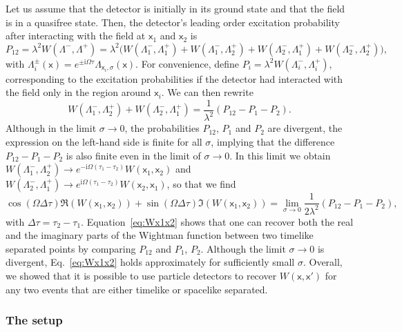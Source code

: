\documentclass[letterpaper,12pt,titlepage,oneside,final]{book}
\newcommand{\mf}{\mathsf}%
\newcommand{\ii}{\mathrm{i}}
\begin{document}
    Let us assume that the detector is initially in its ground state and that the field is in a quasifree state. Then, the detector's leading order excitation probability after interacting with the field at $\mf x_1$ and $\mf x_2$ is
    \begin{equation}
        P_{12} = \lambda^2 W(\Lambda^-,\Lambda^+) = \lambda^2 \big(W(\Lambda_1^-,\Lambda_1^+)+W(\Lambda_1^-,\Lambda_2^+)+W(\Lambda_2^-,\Lambda_1^+)+W(\Lambda_2^-,\Lambda_2^+)\big),
    \end{equation}
    with $\Lambda_i^\pm(\mf x) = e^{\pm \ii \Omega \tau}\Lambda_{\mf x_i,\sigma}(\mf x)$. For convenience, define $P_i = \lambda^2W(\Lambda_{i}^-,\Lambda_{i}^+)$, corresponding to the excitation probabilities if the detector had interacted with the field only in the region around $\mf x_i$. We can then rewrite
    \begin{equation}
        W(\Lambda_1^-,\Lambda_2^+)+W(\Lambda_2^-,\Lambda_1^+) = \frac{1}{\lambda^2}(P_{12} - P_1 - P_2).
    \end{equation}
    Although in the limit $\sigma\to 0$, the probabilities $P_{12}$, $P_1$ and $P_2$ are divergent, the expression on the left-hand side is finite for all $\sigma$, implying that the difference $P_{12} - P_1 - P_2$ is also finite even in the limit of $\sigma\to 0$. In this limit we obtain $W(\Lambda_1^-,\Lambda_2^+)\to e^{-\ii \Omega(\tau_1-\tau_2)}W(\mf x_1, \mf x_2)$ and $W(\Lambda_2^-,\Lambda_1^+)\to e^{\ii \Omega(\tau_1-\tau_2)}W(\mf x_2, \mf x_1)$, so that we find
    \begin{equation}\label{eq:Wx1x2}
        \cos(\Omega \Delta\tau)\Re(W(\mf x_1,\mf x_2)) + \sin(\Omega \Delta\tau)\Im(W(\mf x_1,\mf x_2)) =  \lim_{\sigma \to 0}\frac{1}{2\lambda^2}(P_{12} - P_1 - P_2),
    \end{equation}
    with $\Delta\tau = \tau_2 - \tau_1$. Equation~\eqref{eq:Wx1x2} shows that one can recover both the real and the imaginary parts of the Wightman function between two timelike separated points by comparing $P_{12}$ and $P_1$, $P_2$. Although the limit $\sigma\to 0$ is divergent, Eq.~\eqref{eq:Wx1x2} holds approximately for sufficiently small $\sigma$. Overall, we showed that it is possible to use particle detectors to recover $W(\mf x, \mf x')$ for any two events that are either timelike or spacelike separated.


    \subsubsection*{The setup}\label{sub:general}
    
\end{document}

